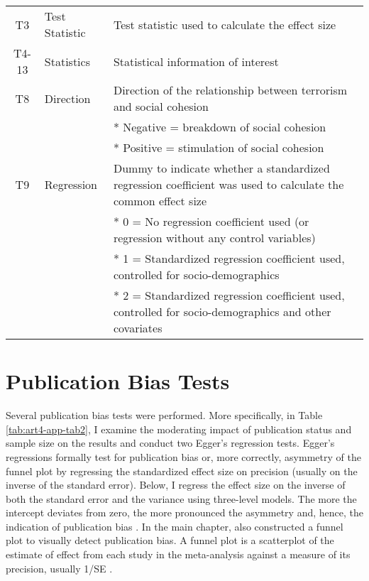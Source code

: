 \begin{longtable}{@{}cL{2.5cm}L{9.5cm}@{}}
T3 & Test Statistic & Test statistic used to calculate the effect size \\
T4-13 & Statistics & Statistical information of interest \\
T8 & Direction & Direction of the relationship between terrorism and social cohesion \\
 &  & * Negative = breakdown of social cohesion \\
 &  & * Positive = stimulation of social cohesion \\
T9 & Regression & Dummy to indicate whether a standardized regression coefficient was used to calculate the common effect size \\
 &  & * 0 = No regression coefficient used (or regression without any control variables) \\
 &  & * 1 = Standardized regression coefficient used, controlled for socio-demographics \\
 &  & * 2 = Standardized regression coefficient used, controlled for socio-demographics and other covariates \\* \bottomrule
\end{longtable}
\endgroup

\newpage
\section{Publication Bias Tests}
\label{app:E3}

Several publication bias tests were performed. More specifically, in Table \ref{tab:art4-app-tab2}, I examine the moderating impact of publication status and sample size on the results and conduct two Egger’s regression tests. Egger's regressions formally test for publication bias or, more correctly, asymmetry of the funnel plot by regressing the standardized effect size on precision (usually on the inverse of the standard error). Below, I regress the effect size on the inverse of both the standard error and the variance using three-level models. The more the intercept deviates from zero, the more pronounced the asymmetry and, hence, the indication of publication bias \citep{Sterne2005}. In the main chapter, also constructed a funnel plot to visually detect publication bias. A funnel plot is a scatterplot of the estimate of effect from each study in the meta-analysis against a measure of its precision, usually 1/SE \citep{Borenstein2009}.


